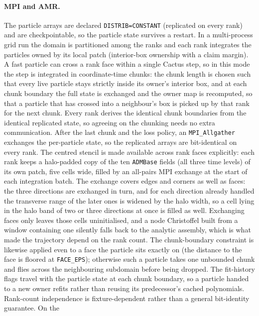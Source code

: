 \documentclass[11pt]{article}
\begin{document}
\paragraph{MPI and AMR.}
The particle arrays are declared \texttt{DISTRIB=CONSTANT} (replicated on
every rank) and are checkpointable, so the particle state survives a
restart.  In a multi-process grid run the domain is partitioned among the
ranks and each rank integrates the particles owned by its local patch
(interior-box ownership with a claim margin).  A fast particle can cross
a rank face within a single Cactus step, so in this mode the step is
integrated in coordinate-time chunks: the chunk length is chosen such
that every live particle stays strictly inside its owner's interior box,
and at each chunk boundary the full state is exchanged and the owner map
is recomputed, so that a particle that has crossed into a neighbour's
box is picked up by that rank for the next chunk.  Every rank derives
the identical chunk boundaries from the identical replicated state, so
agreeing on the chunking needs no extra communication.  After the last
chunk and the loss policy, an \texttt{MPI\_Allgather} exchanges the
per-particle state, so the replicated arrays are bit-identical on every
rank.  The centred stencil is made available across rank faces
explicitly: each rank keeps a halo-padded copy of the ten
\texttt{ADMBase} fields (all three time levels) of its own patch, five
cells wide, filled by an all-pairs MPI exchange at the start of each
integration batch.  The exchange covers edges and corners as well as
faces: the three directions are exchanged in turn, and for each
direction already handled the transverse range of the later ones is
widened by the halo width, so a cell lying in the halo band of two or
three directions at once is filled as well.  Exchanging faces only
leaves those cells uninitialised, and a node Christoffel built from a
window containing one silently falls back to the analytic assembly,
which is what made the trajectory depend on the rank count.  The
chunk-boundary constraint is likewise applied even to a face the
particle sits exactly on (the distance to the face is floored at
\texttt{FACE\_EPS}); otherwise such a particle takes one unbounded
chunk and flies across the neighbouring subdomain before being dropped.
The fit-history flags travel with the particle state at each chunk
boundary, so a particle handed to a new owner refits rather than
reusing its predecessor's cached polynomials.  Rank-count independence is
fixture-dependent rather than a general bit-identity guarantee.  On the
\end{document}
